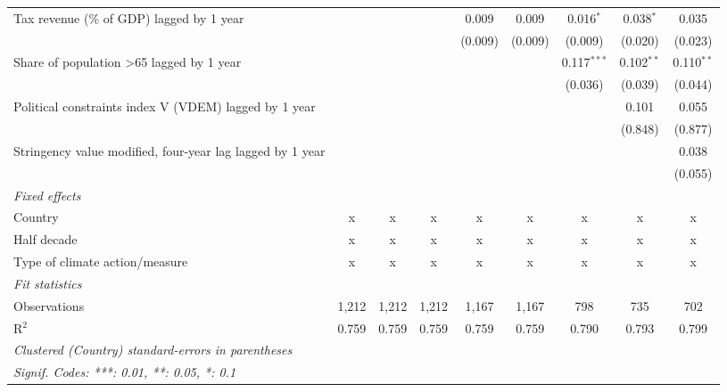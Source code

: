 \begin{tabular}{lcccccccc}
   Tax revenue (\% of GDP) lagged by 1 year                   &         &         &         & 0.009   & 0.009   & 0.016$^{*}$   & 0.038$^{*}$  & 0.035\\   
                                                              &         &         &         & (0.009) & (0.009) & (0.009)       & (0.020)      & (0.023)\\   
   Share of population >65 lagged by 1 year                   &         &         &         &         &         & 0.117$^{***}$ & 0.102$^{**}$ & 0.110$^{**}$\\   
                                                              &         &         &         &         &         & (0.036)       & (0.039)      & (0.044)\\   
   Political constraints index V (VDEM) lagged by 1 year      &         &         &         &         &         &               & 0.101        & 0.055\\   
                                                              &         &         &         &         &         &               & (0.848)      & (0.877)\\   
   Stringency value modified, four-year lag lagged by 1 year  &         &         &         &         &         &               &              & 0.038\\   
                                                              &         &         &         &         &         &               &              & (0.055)\\   
   \emph{Fixed effects}\\
   Country                                                    & x       & x       & x       & x       & x       & x             & x            & x\\  
   Half decade                                                & x       & x       & x       & x       & x       & x             & x            & x\\  
   Type of climate action/measure                             & x       & x       & x       & x       & x       & x             & x            & x\\  
   \midrule \emph{Fit statistics}\\
   Observations                                               & 1,212   & 1,212   & 1,212   & 1,167   & 1,167   & 798           & 735          & 702\\  
   R$^2$                                                      & 0.759   & 0.759   & 0.759   & 0.759   & 0.759   & 0.790         & 0.793        & 0.799\\  
   \midrule
   \multicolumn{9}{l}{\emph{Clustered (Country) standard-errors in parentheses}}\\
   \multicolumn{9}{l}{\emph{Signif. Codes: ***: 0.01, **: 0.05, *: 0.1}}\\
\end{tabular}
\par\endgroup


